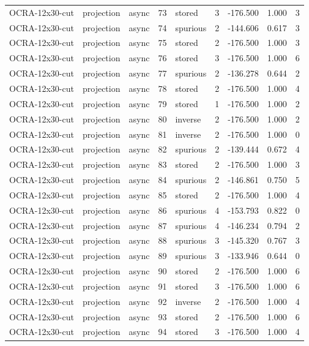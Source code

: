 \begin{tabular}{lllrlrrrr}
OCRA-12x30-cut & projection & async & 73 & stored & 3 & -176.500 & 1.000 & 3 \\
OCRA-12x30-cut & projection & async & 74 & spurious & 2 & -144.606 & 0.617 & 3 \\
OCRA-12x30-cut & projection & async & 75 & stored & 2 & -176.500 & 1.000 & 3 \\
OCRA-12x30-cut & projection & async & 76 & stored & 3 & -176.500 & 1.000 & 6 \\
OCRA-12x30-cut & projection & async & 77 & spurious & 2 & -136.278 & 0.644 & 2 \\
OCRA-12x30-cut & projection & async & 78 & stored & 2 & -176.500 & 1.000 & 4 \\
OCRA-12x30-cut & projection & async & 79 & stored & 1 & -176.500 & 1.000 & 2 \\
OCRA-12x30-cut & projection & async & 80 & inverse & 2 & -176.500 & 1.000 & 2 \\
OCRA-12x30-cut & projection & async & 81 & inverse & 2 & -176.500 & 1.000 & 0 \\
OCRA-12x30-cut & projection & async & 82 & spurious & 2 & -139.444 & 0.672 & 4 \\
OCRA-12x30-cut & projection & async & 83 & stored & 2 & -176.500 & 1.000 & 3 \\
OCRA-12x30-cut & projection & async & 84 & spurious & 2 & -146.861 & 0.750 & 5 \\
OCRA-12x30-cut & projection & async & 85 & stored & 2 & -176.500 & 1.000 & 4 \\
OCRA-12x30-cut & projection & async & 86 & spurious & 4 & -153.793 & 0.822 & 0 \\
OCRA-12x30-cut & projection & async & 87 & spurious & 4 & -146.234 & 0.794 & 2 \\
OCRA-12x30-cut & projection & async & 88 & spurious & 3 & -145.320 & 0.767 & 3 \\
OCRA-12x30-cut & projection & async & 89 & spurious & 3 & -133.946 & 0.644 & 0 \\
OCRA-12x30-cut & projection & async & 90 & stored & 2 & -176.500 & 1.000 & 6 \\
OCRA-12x30-cut & projection & async & 91 & stored & 3 & -176.500 & 1.000 & 6 \\
OCRA-12x30-cut & projection & async & 92 & inverse & 2 & -176.500 & 1.000 & 4 \\
OCRA-12x30-cut & projection & async & 93 & stored & 2 & -176.500 & 1.000 & 6 \\
OCRA-12x30-cut & projection & async & 94 & stored & 3 & -176.500 & 1.000 & 4 \\

\end{tabular}
